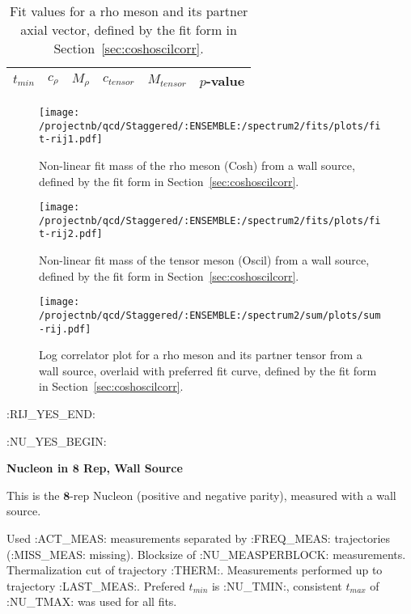\begin{table}[ht!]
\centering
\scriptsize
\begin{tabular}{|c|c|c|c|c|c|}
\hline
 $t_{min}$ & $c_{\rho}$ &  $M_{\rho}$ & $c_{tensor}$ & $M_{tensor}$ & $p$-value \\
\hline

\end{tabular}
\caption{Fit values for a rho meson and its partner axial vector, defined by the fit form in Section~\ref{sec:coshoscilcorr}.}
\end{table}

\begin{multicols}{2}
\begin{figure}[H]
\centering
\texttt{[image: /projectnb/qcd/Staggered/:ENSEMBLE:/spectrum2/fits/plots/fit-rij1.pdf]}
\caption{Non-linear fit mass of the rho meson (Cosh) from a wall source, defined by the fit form in Section~\ref{sec:coshoscilcorr}.}
\end{figure}
\columnbreak
\begin{figure}[H]
\centering
\texttt{[image: /projectnb/qcd/Staggered/:ENSEMBLE:/spectrum2/fits/plots/fit-rij2.pdf]}
\caption{Non-linear fit mass of the tensor meson (Oscil) from a wall source, defined by the fit form in Section~\ref{sec:coshoscilcorr}.}
\end{figure}
\end{multicols}

\begin{figure}[H]
\centering
\texttt{[image: /projectnb/qcd/Staggered/:ENSEMBLE:/spectrum2/sum/plots/sum-rij.pdf]}
\caption{Log correlator plot for a rho meson and its partner tensor from a wall source, overlaid with preferred fit curve, defined by the fit form in Section~\ref{sec:coshoscilcorr}.}
\end{figure}


\clearpage
:RIJ_YES_END:

:NU_YES_BEGIN:
\centerline{\textbf{Nucleon in $\mathbf{8}$ Rep, Wall Source}}

This is the $\mathbf{8}$-rep Nucleon (positive and negative parity), measured with a wall source.

{\small{Used :ACT_MEAS: measurements separated by :FREQ_MEAS: trajectories (:MISS_MEAS: missing). Blocksize of :NU_MEASPERBLOCK: measurements. Thermalization cut of trajectory :THERM:. Measurements performed up to trajectory :LAST_MEAS:. Prefered $t_{min}$ is :NU_TMIN:, consistent $t_{max}$ of :NU_TMAX: was used for all fits.}}


